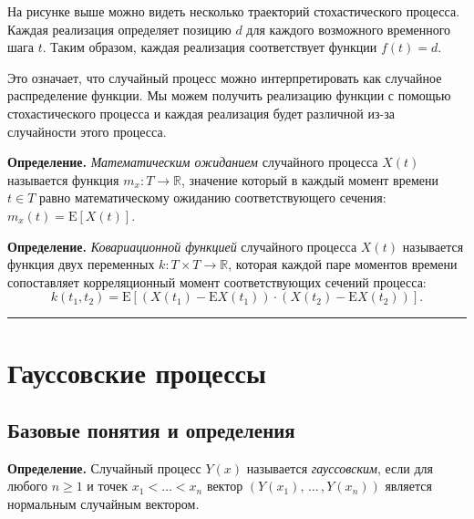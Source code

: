 \documentclass[11pt,a4paper]{article}
\begin{document}
На рисунке выше можно видеть несколько траекторий стохастического
процесса. Каждая реализация определяет позицию \(d\) для каждого
возможного временного шага \(t\). Таким образом, каждая реализация
соответствует функции \(f(t) = d\).

Это означает, что случайный процесс можно интерпретировать как случайное
распределение функции. Мы можем получить реализацию функции с помощью
стохастического процесса и каждая реализация будет различной из-за
случайности этого процесса.

\textbf{Определение.} \emph{Математическим ожиданием} случайного
процесса \(X(t)\) называется функция \(m_x : T \rightarrow \mathbb{R}\),
значение который в каждый момент времени \(t \in T\) равно
математическому ожиданию соответствующего сечения:
\(m_x(t) = \mathrm{E}[X(t)]\).

\textbf{Определение.} \emph{Ковариационной функцией} случайного процесса
\(X(t)\) называется функция двух переменных
\(k : T \times T \rightarrow \mathbb{R}\), которая каждой паре моментов
времени сопоставляет корреляционный момент соответствующих сечений
процесса: \[
  k(t_1, t_2) = \mathrm{E} \left[ \left(X(t_1) - \mathrm{E}X(t_1)\right) \cdot \left(X(t_2) - \mathrm{E}X(t_2)\right) \right].
\]

    \begin{center}\rule{0.5\linewidth}{0.5pt}\end{center}

    \hypertarget{ux433ux430ux443ux441ux441ux43eux432ux441ux43aux438ux435-ux43fux440ux43eux446ux435ux441ux441ux44b}{%
\section{Гауссовские
процессы}\label{ux433ux430ux443ux441ux441ux43eux432ux441ux43aux438ux435-ux43fux440ux43eux446ux435ux441ux441ux44b}}

    \hypertarget{ux431ux430ux437ux43eux432ux44bux435-ux43fux43eux43dux44fux442ux438ux44f-ux438-ux43eux43fux440ux435ux434ux435ux43bux435ux43dux438ux44f}{%
\subsection{Базовые понятия и
определения}\label{ux431ux430ux437ux43eux432ux44bux435-ux43fux43eux43dux44fux442ux438ux44f-ux438-ux43eux43fux440ux435ux434ux435ux43bux435ux43dux438ux44f}}

\textbf{Определение.} Случайный процесс \(Y(x)\) называется
\emph{гауссовским}, если для любого \(n \ge 1\) и точек
\(x_1 < \ldots < x_n\) вектор \((Y(x_1), \, \ldots \, , Y(x_n))\)
является нормальным случайным вектором.
\end{document}
